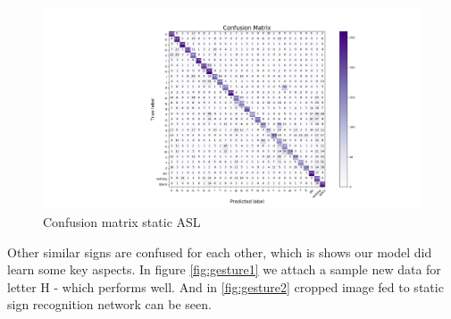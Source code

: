 \documentclass[10pt,twocolumn,letterpaper]{article}
\begin{document}
\begin{figure}
	\includegraphics[width=\linewidth]{confusion_asl.png}
	\caption{Confusion matrix static ASL}
	\label{fig:conf1}
\end{figure}

Other similar signs are confused for each other, which is shows our model did learn
some key aspects. In figure \ref{fig:gesture1} we attach a sample new data for letter H - which performs well.
And in \ref{fig:gesture2} cropped image fed to static sign recognition network can be seen. 
\end{document}
